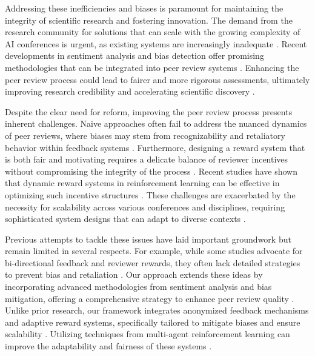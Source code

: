 \documentclass[11pt]{article}
\begin{document}
Addressing these inefficiencies and biases is paramount for maintaining the integrity of scientific research and fostering innovation. The demand from the research community for solutions that can scale with the growing complexity of AI conferences is urgent, as existing systems are increasingly inadequate \citep{a2024,endtoend2021,position2025}. Recent developments in sentiment analysis and bias detection offer promising methodologies that can be integrated into peer review systems \citep{bias2021,sentinel2025,sentinet2022,leveraging2020}. Enhancing the peer review process could lead to fairer and more rigorous assessments, ultimately improving research credibility and accelerating scientific discovery \citep{a2023}.

Despite the clear need for reform, improving the peer review process presents inherent challenges. Naive approaches often fail to address the nuanced dynamics of peer reviews, where biases may stem from recognizability and retaliatory behavior within feedback systems \citep{climb2024,disparities2025}. Furthermore, designing a reward system that is both fair and motivating requires a delicate balance of reviewer incentives without compromising the integrity of the process \citep{disparities2025,students2021,level2025}. Recent studies have shown that dynamic reward systems in reinforcement learning can be effective in optimizing such incentive structures \citep{drta2025,adversarial2019}. These challenges are exacerbated by the necessity for scalability across various conferences and disciplines, requiring sophisticated system designs that can adapt to diverse contexts \citep{latent2020,a2024}.

Previous attempts to tackle these issues have laid important groundwork but remain limited in several respects. For example, while some studies advocate for bi-directional feedback and reviewer rewards, they often lack detailed strategies to prevent bias and retaliation \citep{deriving2020,improving2017}. Our approach extends these ideas by incorporating advanced methodologies from sentiment analysis and bias mitigation, offering a comprehensive strategy to enhance peer review quality \citep{sentiment2024,discussions2022,through2021}. Unlike prior research, our framework integrates anonymized feedback mechanisms and adaptive reward systems, specifically tailored to mitigate biases and ensure scalability \citep{backdoor2023,racism2023}. Utilizing techniques from multi-agent reinforcement learning can improve the adaptability and fairness of these systems \citep{explainable2024,explaining2024}.
\end{document}
